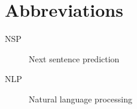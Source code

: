 %
%
%
%

\section{Abbreviations}
\begin{description}
	\item [NSP] Next sentence prediction
	\item [NLP] Natural language processing
\end{description}
